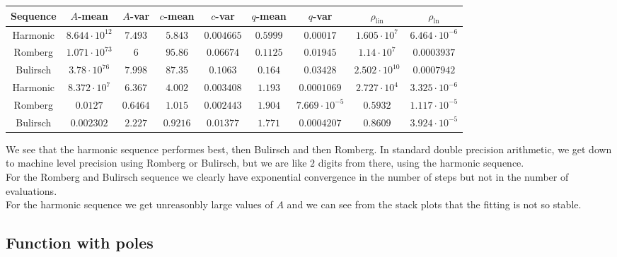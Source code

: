 \begin{table}[H]
    \centering
    \small
    \begin{tabular}{c||c|c|c|c|c|c|c|c}
Sequence & \(A\)-mean & \(A\)-var & \(c\)-mean & \(c\)-var & \(q\)-mean & \(q\)-var & \(\rho_{\operatorname{lin}}\) & \(\rho_{\ln}\)\\\hline
\rowcolor{yellow}
Harmonic & \(8.644\cdot 10^{12}\) & \(7.493\) & \(5.843\) & \(0.004665\) & \(0.5999\) & \(0.00017\) & \(1.605\cdot 10^7\) & \(6.464\cdot 10^{-6}\) \\
\rowcolor{red}
Romberg & \(1.071\cdot 10^{73}\) & \(6\) & \(95.86\) & \(0.06674\) & \(0.1125\) & \(0.01945\) & \(1.14\cdot 10^7\) & \(0.0003937\) \\
\rowcolor{red}
Bulirsch & \(3.78\cdot 10^{76}\) & \(7.998\) & \(87.35\) & \(0.1063\) & \(0.164\) & \(0.03428\) & \(2.502\cdot 10^{10}\) & \(0.0007942\) \\
\rowcolor{yellow}
Harmonic & \(8.372\cdot 10^7\) & \(6.367\) & \(4.002\) & \(0.003408\) & \(1.193\) & \(0.0001069\) & \(2.727\cdot 10^4\) & \(3.325\cdot 10^{-6}\) \\
\rowcolor{green}
Romberg & \(0.0127\) & \(0.6464\) & \(1.015\) & \(0.002443\) & \(1.904\) & \(7.669\cdot 10^{-5}\) & \(0.5932\) & \(1.117\cdot 10^{-5}\) \\
\rowcolor{green}
Bulirsch & \(0.002302\) & \(2.227\) & \(0.9216\) & \(0.01377\) & \(1.771\) & \(0.0004207\) & \(0.8609\) & \(3.924\cdot 10^{-5}\) \\
    \end{tabular}
    \label{tab:my_label}
\end{table}

We see that the harmonic sequence performes best, then Bulirsch and then Romberg. In standard double precision arithmetic, we get down to machine level precision using Romberg or Bulirsch, but we are like \(2\) digits from there, using the harmonic sequence.\\

For the Romberg and Bulirsch sequence we clearly have exponential convergence in the number of steps but not in the number of evaluations.\\

For the harmonic sequence we get unreasonbly large values of \(A\) and we can see from the stack plots that the fitting is not so stable.\\

\subsection{Function with poles}

